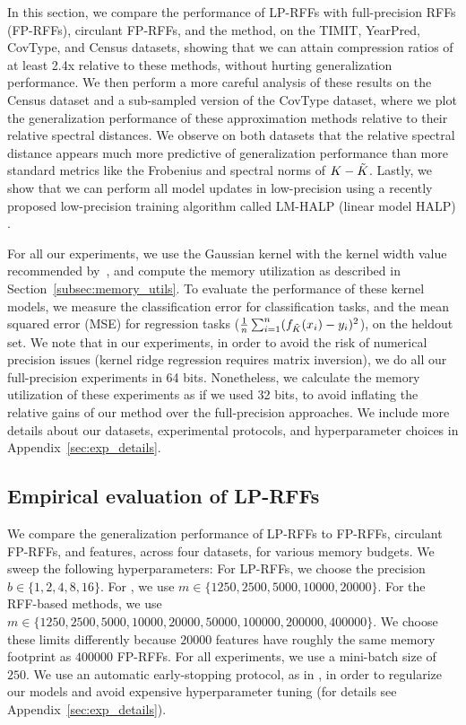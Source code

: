 In this section, we compare the performance of LP-RFFs with full-precision RFFs (FP-RFFs), circulant FP-RFFs, and the \Nystrom method, on the TIMIT, YearPred, CovType, and Census datasets, showing that we can attain compression ratios of at least 2.4x relative to these methods, without hurting generalization performance. We then perform a more careful analysis of these results on the Census dataset and a sub-sampled version of the CovType dataset, where we plot the generalization performance of these approximation methods relative to their relative spectral distances. We observe on both datasets that the relative spectral distance appears much more predictive of generalization performance than more standard metrics like the Frobenius and spectral norms of $K-\tilde{K}$. Lastly, we show that we can perform all model updates in low-precision using a recently proposed low-precision training algorithm called LM-HALP (linear model HALP) \citep{halp18}.

For all our experiments, we use the Gaussian kernel with the kernel width value recommended by~\citet{may2017}, and compute the memory utilization as described in Section~\ref{subsec:memory_utils}. To evaluate the performance of these kernel models, we measure the classification error for classification tasks, and the mean squared error (MSE) for regression tasks ($\frac{1}{n}\sum_{i=1}^n (f_{\tilde{K}}(x_i) - y_i)^2$), on the heldout set. We note that in our experiments, in order to avoid the risk of numerical precision issues (kernel ridge regression requires matrix inversion), we do all our full-precision experiments in 64 bits.  Nonetheless, we calculate the memory utilization of these experiments as if we used 32 bits, to avoid inflating the relative gains of our method over the full-precision approaches.  We include more details about our datasets, experimental protocols, and hyperparameter choices in Appendix~\ref{sec:exp_details}.

\subsection{Empirical evaluation of LP-RFFs}
We compare the generalization performance of LP-RFFs to FP-RFFs, circulant FP-RFFs, and \Nystrom features, across four datasets, for various memory budgets.  We sweep the following hyperparameters: For LP-RFFs, we choose the precision $b \in \{1,2,4,8,16\}$. For \NystromNS, we use $m \in \{1250, 2500, 5000, 10000, 20000\}$.  For the RFF-based methods, we use $m\in \{1250, 2500, 5000, 10000, 20000, 50000, 100000, 200000, 400000\}$. We choose these limits differently because $\num[group-separator={,}]{20000}$ \Nystrom features have roughly the same memory footprint as $\num[group-separator={,}]{400000}$ FP-RFFs. For all experiments, we use a mini-batch size of $250$.  We use an automatic early-stopping protocol, as in \citep{morgan1990generalization,sainath2013b,sainath2013low}, in order to regularize our models \citep{zhang2005boosting,wei2017early} and avoid expensive hyperparameter tuning (for details see Appendix~\ref{sec:exp_details}).

